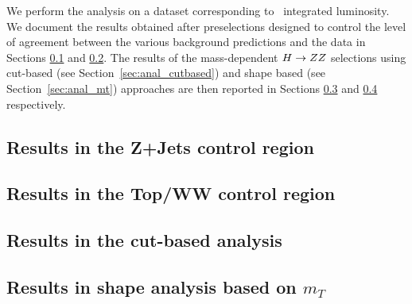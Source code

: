 We perform the analysis on a dataset corresponding to \intlumi\ integrated luminosity. 
We document the results obtained after preselections
designed to control the level of agreement between the various background predictions
and the data in Sections \ref{sec:results_zzpresel} and \ref{sec:results_topww}.
The results of the mass-dependent $H\to ZZ$ selections using cut-based 
(see Section~\ref{sec:anal_cutbased}) and shape based (see Section~\ref{sec:anal_mt}) approaches
are then reported in Sections \ref{sec:results_cut} and \ref{sec:results_mtshape} respectively.

\subsection{Results in the Z+Jets control region}
\label{sec:results_zzpresel}

\clearpage

\subsection{Results in the Top/WW control region}
\label{sec:results_topww}

\clearpage

\subsection{Results in the cut-based analysis}
\label{sec:results_cut}

\clearpage

\subsection{Results in shape analysis based on $m_T$}
\label{sec:results_mtshape}

\clearpage
 
